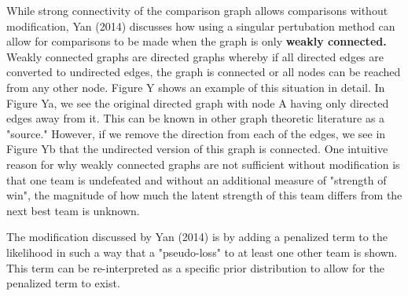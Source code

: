 \documentclass{article}
\begin{document}
While strong connectivity of the comparison graph allows comparisons without modification, Yan (2014) discusses how using a singular pertubation method can allow for comparisons to be made when the graph is only \textbf{weakly connected.} Weakly connected graphs are directed graphs whereby if all directed edges are converted to undirected edges, the graph is connected or all nodes can be reached from any other node. Figure Y shows an example of this situation in detail. In Figure Ya, we see the original directed graph with node A having only directed edges away from it. This can be known in other graph theoretic literature as a "source." However, if we remove the direction from each of the edges, we see in Figure Yb that the undirected version of this graph is connected. One intuitive reason for why weakly connected graphs are not sufficient without modification is that one team is undefeated and without an additional measure of "strength of win", the magnitude of how much the latent strength of this team differs from the next best team is unknown. 

The modification discussed by Yan (2014) is by adding a penalized term to the likelihood in such a way that a "pseudo-loss" to at least one other team is shown. This term can be re-interpreted as a specific prior distribution to allow for the penalized term to exist.\cite{bts}


\printbibliography
\end{document}
